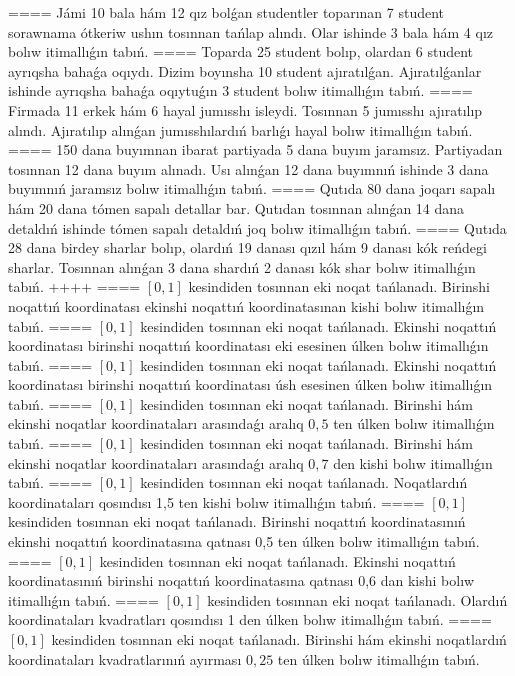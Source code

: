 ====
Jámi 10 bala hám 12 qız bolǵan studentler toparınan 7 student sorawnama ótkeriw ushın tosınnan tańlap alındı. Olar ishinde 3 bala hám 4 qız bolıw itimallıǵın tabıń.
====
Toparda 25 student bolıp, olardan 6 student ayrıqsha bahaǵa oqıydı. Dizim boyınsha 10 student ajıratılǵan. Ajıratılǵanlar ishinde ayrıqsha bahaǵa oqıytuǵın 3 student bolıw itimallıǵın tabıń.
====
Firmada 11 erkek hám 6 hayal jumısshı isleydi. Tosınnan 5 jumısshı ajıratılıp alındı. Ajıratılıp alınǵan jumısshılardıń barlıǵı hayal bolıw itimallıǵın tabıń.
====
150 dana buyımnan ibarat partiyada 5 dana buyım jaramsız. Partiyadan tosınnan 12 dana buyım alınadı. Usı alınǵan 12 dana buyımnıń ishinde 3 dana buyımnıń jaramsız bolıw itimallıǵın tabıń. 
====
Qutıda 80 dana joqarı sapalı hám 20 dana tómen sapalı detallar bar. Qutıdan tosınnan alınǵan 14 dana detaldıń ishinde tómen sapalı detaldıń joq bolıw itimallıǵın tabıń.
====
Qutıda 28 dana birdey sharlar bolıp, olardıń 19 danası qızıl hám 9 danası kók reńdegi sharlar. Tosınnan alınǵan 3 dana shardıń 2 danası kók shar bolıw itimallıǵın tabıń.
++++
====
$\left[ 0,1 \right]$ kesindiden tosınnan eki noqat tańlanadı. Birinshi noqattıń koordinatası ekinshi noqattıń koordinatasınan kishi bolıw itimallıǵın tabıń.
====
$\left[ 0,1 \right]$ kesindiden tosınnan eki noqat tańlanadı. Ekinshi noqattıń koordinatası birinshi noqattıń koordinatası eki esesinen úlken bolıw itimallıǵın tabıń.
====
$\left[ 0,1 \right]$ kesindiden tosınnan eki noqat tańlanadı. Ekinshi noqattıń koordinatası birinshi noqattıń koordinatası úsh esesinen úlken bolıw itimallıǵın tabıń.
====
$\left[ 0,1 \right]$ kesindiden tosınnan eki noqat tańlanadı. Birinshi hám ekinshi noqatlar koordinataları arasındaǵı aralıq $0,5$ ten úlken bolıw itimallıǵın tabıń.
====
$\left[ 0,1 \right]$ kesindiden tosınnan eki noqat tańlanadı. Birinshi hám ekinshi noqatlar koordinataları arasındaǵı aralıq $0,7$ den kishi bolıw itimallıǵın tabıń.
====
$\left[ 0,1 \right]$ kesindiden tosınnan eki noqat tańlanadı. Noqatlardıń koordinataları qosındısı 1,5 ten kishi bolıw itimallıǵın tabıń.
====
$\left[ 0,1 \right]$ kesindiden tosınnan eki noqat tańlanadı. Birinshi noqattıń koordinatasınıń ekinshi noqattıń koordinatasına qatnası 0,5 ten úlken bolıw itimallıǵın tabıń.
====
$\left[ 0,1 \right]$ kesindiden tosınnan eki noqat tańlanadı. Ekinshi noqattıń koordinatasınıń birinshi noqattıń koordinatasına qatnası 0,6 dan kishi bolıw itimallıǵın tabıń.
====
$\left[ 0,1 \right]$ kesindiden tosınnan eki noqat  tańlanadı. Olardıń koordinataları kvadratları qosındısı 1 den úlken bolıw itimallıǵın tabıń.
====
$\left[ 0,1 \right]$ kesindiden tosınnan eki noqat tańlanadı. Birinshi hám ekinshi noqatlardıń koordinataları kvadratlarınıń ayırması $0,25$ ten úlken bolıw itimallıǵın tabıń.
